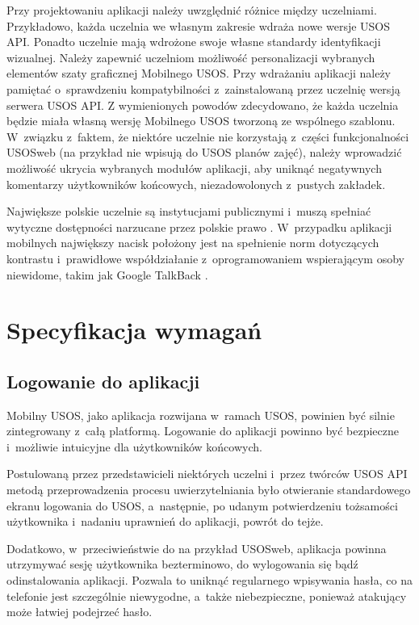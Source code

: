 \documentclass{pracamgr}
\begin{document}
Przy projektowaniu aplikacji należy uwzględnić różnice między uczelniami.
Przykładowo, każda uczelnia we własnym zakresie wdraża nowe wersje USOS API.
Ponadto uczelnie mają wdrożone swoje własne standardy identyfikacji wizualnej.
Należy zapewnić uczelniom możliwość personalizacji wybranych elementów szaty
graficznej Mobilnego USOS. Przy wdrażaniu aplikacji należy pamiętać o~sprawdzeniu kompatybilności z~zainstalowaną przez uczelnię wersją serwera USOS API.
Z wymienionych powodów zdecydowano, że każda uczelnia będzie miała własną
wersję Mobilnego USOS tworzoną ze wspólnego szablonu. W~związku z~faktem, że
niektóre uczelnie nie korzystają z~części funkcjonalności USOSweb (na przykład nie
wpisują do USOS planów zajęć), należy wprowadzić możliwość ukrycia wybranych modułów aplikacji,
aby uniknąć negatywnych komentarzy użytkowników końcowych, niezadowolonych z~pustych zakładek.

Największe polskie uczelnie są instytucjami publicznymi i~muszą spełniać wytyczne
dostępności narzucane przez polskie prawo \cite{uodc}. W~przypadku aplikacji mobilnych
największy nacisk położony jest na spełnienie norm dotyczących kontrastu i~prawidłowe
współdziałanie z~oprogramowaniem wspierającym osoby niewidome, takim jak Google
TalkBack \cite{talkback}.

\chapter{Specyfikacja wymagań}
\label{sec:specyfikacja}

\section{Logowanie do aplikacji}

Mobilny USOS, jako aplikacja rozwijana w~ramach USOS, powinien być silnie 
zintegrowany z~całą platformą. Logowanie do aplikacji powinno być bezpieczne i~możliwie
intuicyjne dla użytkowników końcowych.

Postulowaną przez przedstawicieli niektórych uczelni i~przez twórców USOS API
metodą przeprowadzenia procesu uwierzytelniania było otwieranie standardowego ekranu
logowania do USOS, a~następnie, po udanym potwierdzeniu tożsamości użytkownika
i~nadaniu uprawnień do aplikacji, powrót do tejże.

Dodatkowo, w~przeciwieństwie do na przykład USOSweb, aplikacja powinna utrzymywać
sesję użytkownika bezterminowo, do wylogowania się bądź odinstalowania aplikacji.
Pozwala to uniknąć regularnego wpisywania hasła, co na telefonie jest szczególnie
niewygodne, a~także niebezpieczne, ponieważ atakujący może łatwiej podejrzeć hasło.
\end{document}
